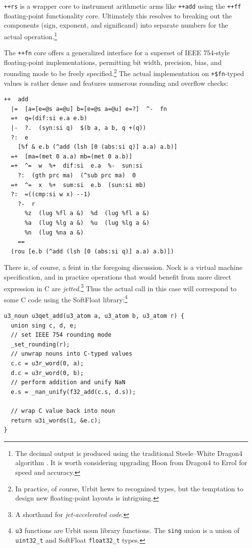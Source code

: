 \documentclass[twoside]{article}
\begin{document}
\lstinline[style=inlinecode]{++rs} is a wrapper core to instrument arithmetic arms like \lstinline[style=inlinecode]{++add} using the \lstinline[style=inlinecode]{++ff} floating-point functionality core.  Ultimately this resolves to breaking out the components (sign, exponent, and significand) into separate numbers for the actual operation.\footnote{The decimal output is produced using the traditional Steele–White Dragon4 algorithm \citep{Steele1991}.  It is worth considering upgrading Hoon from Dragon4 to Errol \citep{Andrysco2016} for speed and accuracy.}

The \lstinline[style=inlinecode]{++fn} core offers a generalized interface for a superset of IEEE 754-style floating-point implementations, permitting bit width, precision, bias, and rounding mode to be freely specified.\footnote{In practice, of course, Urbit hews to recognized types, but the temptation to design new floating-point layouts is intriguing.}  The actual implementation on \lstinline[style=inlinecode]{+$fn}-typed values is rather dense and features numerous rounding and overflow checks:

\begin{lstlisting}[style=listingcode]
++  add
  |=  [a=[e=@s a=@u] b=[e=@s a=@u] e=?]  ^-  fn
  =+  q=(dif:si e.a e.b)
  |-  ?.  (syn:si q)  $(b a, a b, q +(q))
  ?:  e
    [%f & e.b (^add (lsh [0 (abs:si q)] a.a) a.b)]
  =+  [ma=(met 0 a.a) mb=(met 0 a.b)]
  =+  ^=  w  %+  dif:si  e.a  %-  sun:si
    ?:  (gth prc ma)  (^sub prc ma)  0
  =+  ^=  x  %+  sum:si  e.b  (sun:si mb)
  ?:  =((cmp:si w x) --1)
    ?-  r
      %z  (lug %fl a &)  %d  (lug %fl a &)
      %a  (lug %lg a &)  %u  (lug %lg a &)
      %n  (lug %na a &)
    ==
  (rou [e.b (^add (lsh [0 (abs:si q)] a.a) a.b)])
\end{lstlisting}

There is, of course, a feint in the foregoing discussion.  Nock is a virtual machine specification, and in practice operations that would benefit from more direct expression in C are \emph{jetted}.\footnote{A shorthand for \emph{jet-accelerated code}.}  Thus the actual call in this case will correspond to some C code using the SoftFloat library:\footnote{\texttt{u3} functions are Urbit noun library functions.  The \texttt{sing} union is a union of \texttt{uint32\_t} and SoftFloat \texttt{float32\_t} types.}

\lstset{language=C}
\begin{lstlisting}[style=listingcode_c]
u3_noun u3qet_add(u3_atom a, u3_atom b, u3_atom r) {
  union sing c, d, e;
  // set IEEE 754 rounding mode
  _set_rounding(r);
  // unwrap nouns into C-typed values
  c.c = u3r_word(0, a);
  d.c = u3r_word(0, b);
  // perform addition and unify NaN
  e.s = _nan_unify(f32_add(c.s, d.s));

  // wrap C value back into noun
  return u3i_words(1, &e.c);
}
\end{lstlisting}
\end{document}
